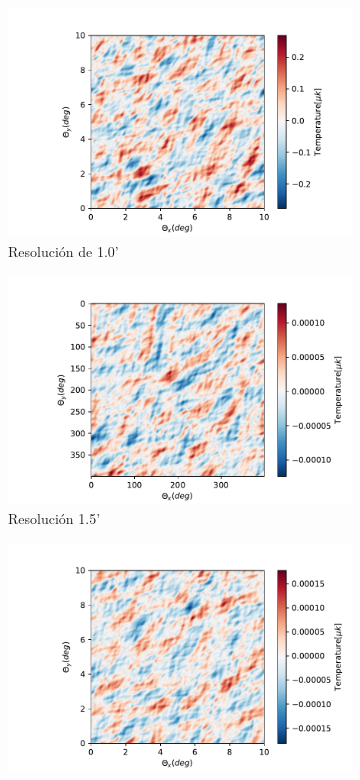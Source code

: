 \documentclass[a4paper]{article}
\begin{document}
\begin{figure}
\centering
\begin{subfigure}[b]{0.45\linewidth}
\includegraphics[width=\linewidth]{CMB1ma.pdf}
\caption{Resolución de 1.0'}
\label{fig:CMB1ma}
\end{subfigure}
\begin{subfigure}[b]{0.45\linewidth}
\includegraphics[width=\linewidth]{CMB15ma.pdf}
\caption{Resolución 1.5'}
\label{fig:CMB15ma}
\end{subfigure}
\begin{subfigure}[b]{0.45\linewidth}
\includegraphics[width=\linewidth]{CMB2ma.pdf}

\end{subfigure}
\end{figure}
\end{document}
